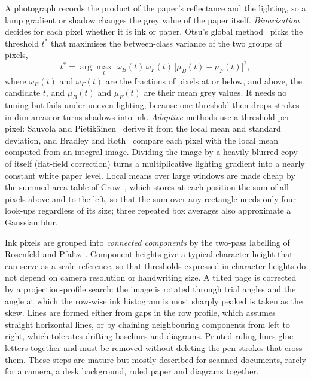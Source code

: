 A photograph records the product of the paper's reflectance and the lighting, so a lamp gradient or shadow changes the grey value of the paper itself. \emph{Binarisation} decides for each pixel whether it is ink or paper. Otsu's global method~\cite{otsu1979} picks the threshold $t^{*}$ that maximises the between-class variance of the two groups of pixels,
\begin{equation}
t^{*}=\arg\max_{t}\;\omega_{B}(t)\,\omega_{F}(t)\,\bigl[\mu_{B}(t)-\mu_{F}(t)\bigr]^{2},
\label{eq:lit-otsu}
\end{equation}
where $\omega_B(t)$ and $\omega_F(t)$ are the fractions of pixels at or below, and above, the candidate $t$, and $\mu_B(t)$ and $\mu_F(t)$ are their mean grey values. It needs no tuning but fails under uneven lighting, because one threshold then drops strokes in dim areas or turns shadows into ink. \emph{Adaptive} methods use a threshold per pixel: Sauvola and Pietik\"ainen~\cite{sauvola2000} derive it from the local mean and standard deviation, and Bradley and Roth~\cite{bradley2007} compare each pixel with the local mean computed from an integral image. Dividing the image by a heavily blurred copy of itself (flat-field correction) turns a multiplicative lighting gradient into a nearly constant white paper level. Local means over large windows are made cheap by the summed-area table of Crow~\cite{crow1984}, which stores at each position the sum of all pixels above and to the left, so that the sum over any rectangle needs only four look-ups regardless of its size; three repeated box averages also approximate a Gaussian blur.

Ink pixels are grouped into \emph{connected components} by the two-pass labelling of Rosenfeld and Pfaltz~\cite{rosenfeld1966}. Component heights give a typical character height that can serve as a scale reference, so that thresholds expressed in character heights do not depend on camera resolution or handwriting size. A tilted page is corrected by a projection-profile search: the image is rotated through trial angles and the angle at which the row-wise ink histogram is most sharply peaked is taken as the skew. Lines are formed either from gaps in the row profile, which assumes straight horizontal lines, or by chaining neighbouring components from left to right, which tolerates drifting baselines and diagrams. Printed ruling lines glue letters together and must be removed without deleting the pen strokes that cross them. These steps are mature but mostly described for scanned documents, rarely for a camera, a desk background, ruled paper and diagrams together.

